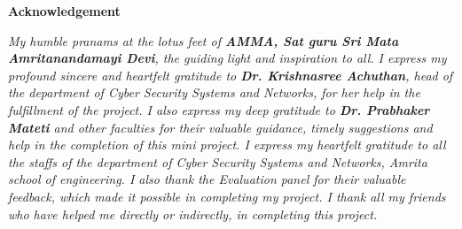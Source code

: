 \begin{center}
\textbf{ \huge Acknowledgement}
\end{center}

\vspace{0.5cm}
\justify
\textit{ My humble pranams at the lotus feet of \textbf{AMMA, Sat guru Sri Mata Amritanandamayi Devi}, the guiding light and inspiration to all.
I express my profound sincere and heartfelt gratitude to \textbf{Dr. Krishnasree Achuthan}, head of the department of Cyber Security Systems and Networks, for her help in the fulfillment of the project.
I also express my deep gratitude to \textbf{Dr. Prabhaker Mateti} and other faculties for their valuable guidance, timely suggestions and help in the completion of this mini project.
I express my heartfelt gratitude to all the staffs of the department of Cyber Security Systems and Networks, Amrita school of engineering.
I also thank the Evaluation panel for their valuable feedback, which made it possible in completing my project.
I thank all my friends who have helped me directly or indirectly, in completing this project.
}